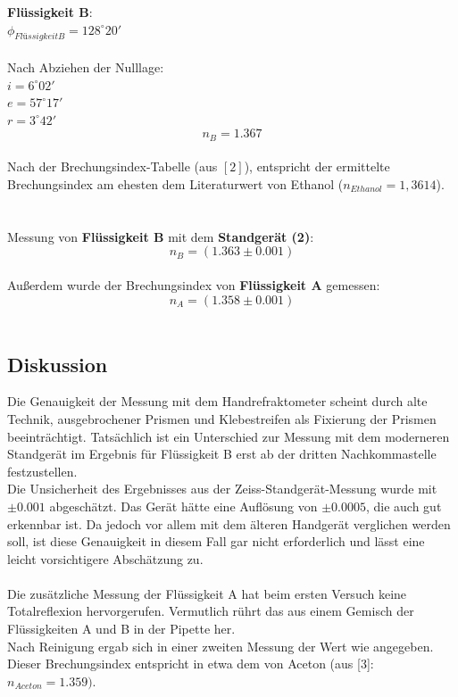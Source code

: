 \documentclass[12pt,a4paper]{article}
\begin{document}
\begin{multicols}{2}
\pagebreak

\noindent \textbf{Flüssigkeit B}:\\
$\phi_{FlüssigkeitB} = 128^\circ 20'$\\
\\
Nach Abziehen der Nulllage:\\
$i = 6^\circ 02'$\\
$e = 57^\circ 17'$\\
$r = 3^\circ 42'$
$$n_B = 1.367$$
\\
Nach der Brechungsindex-Tabelle (aus $[2]$), entspricht der ermittelte Brechungsindex am ehesten dem Literaturwert von Ethanol ($n_{Ethanol} = 1,3614$).\\
\\
\\
Messung von \textbf{Flüssigkeit B} mit dem \textbf{Standgerät (2)}:\\
$$n_B = (1.363 \pm 0.001)$$
\\
Außerdem wurde der Brechungsindex von \textbf{Flüssigkeit A} gemessen:\\
$$n_A = (1.358 \pm 0.001)$$
\\

\subsection{Diskussion}
Die Genauigkeit der Messung mit dem Handrefraktometer scheint durch alte Technik, ausgebrochener Prismen und Klebestreifen als Fixierung der Prismen beeinträchtigt. Tatsächlich ist ein Unterschied zur Messung mit dem moderneren Standgerät im Ergebnis für Flüssigkeit B erst ab der dritten Nachkommastelle festzustellen.\\

Die Unsicherheit des Ergebnisses aus der Zeiss-Standgerät-Messung wurde mit $\pm 0.001$ abgeschätzt. Das Gerät hätte eine Auflösung von $\pm 0.0005$, die auch gut erkennbar ist. Da jedoch vor allem mit dem älteren Handgerät verglichen werden soll, ist diese Genauigkeit in diesem Fall gar nicht erforderlich und lässt eine leicht vorsichtigere Abschätzung zu.
\\
\\
Die zusätzliche Messung der Flüssigkeit A hat beim ersten Versuch keine Totalreflexion hervorgerufen. Vermutlich rührt das aus einem Gemisch der Flüssigkeiten A und B in der Pipette her.\\
Nach Reinigung ergab sich in einer zweiten Messung der Wert wie angegeben. Dieser Brechungsindex entspricht in etwa dem von Aceton (aus [3]: $n_{Aceton}=1.359).$\\


\end{multicols}
\end{document}
